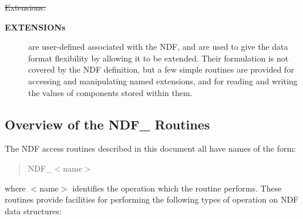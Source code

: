 \newpage
{\large \st{Extensions:}}

\begin{description}

\item[{\bf EXTENSIONs}] are user-defined  associated with the NDF, and are used
to give the data format flexibility by allowing it to be extended.
Their formulation is not covered by the NDF definition, but a few simple
routines are provided for accessing and manipulating named extensions, and
for reading and writing the values of components stored within them. 

\end{description}

\subsection{Overview of the NDF\_ Routines}

The NDF access routines described in this document all have names of the 
form:

\small
\begin{quote}
NDF\_$<$name$>$
\end{quote}
\normalsize

where $<$name$>$ identifies the operation which the routine performs.
These routines provide facilities for performing the following types of
operation on NDF data structures: 

